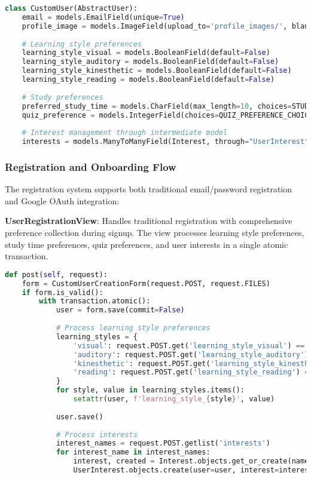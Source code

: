 \documentclass[12pt,a4paper]{article}
\begin{document}
\begin{lstlisting}[language=Python, caption=CustomUser Model Implementation]
class CustomUser(AbstractUser):
    email = models.EmailField(unique=True)
    profile_image = models.ImageField(upload_to='profile_images/', blank=True, null=True)
    
    # Learning style preferences
    learning_style_visual = models.BooleanField(default=False)
    learning_style_auditory = models.BooleanField(default=False)
    learning_style_kinesthetic = models.BooleanField(default=False)
    learning_style_reading = models.BooleanField(default=False)
    
    # Study preferences
    preferred_study_time = models.CharField(max_length=10, choices=STUDY_TIME_CHOICES, default='medium')
    quiz_preference = models.IntegerField(choices=QUIZ_PREFERENCE_CHOICES, default=3)
    
    # Interest management through intermediate model
    interests = models.ManyToManyField(Interest, through="UserInterest", related_name="users", blank=True)
\end{lstlisting}

\subsubsection{Registration and Onboarding Flow}

The registration system supports both traditional email/password registration and Google OAuth integration:

\textbf{UserRegistrationView}: Handles traditional registration with comprehensive preference collection during signup. The view processes learning style preferences, study time preferences, quiz preferences, and user interests in a single atomic transaction.

\begin{lstlisting}[language=Python, caption=Registration Flow Implementation]
def post(self, request):
    form = CustomUserCreationForm(request.POST, request.FILES)
    if form.is_valid():
        with transaction.atomic():
            user = form.save(commit=False)
            
            # Process learning style preferences
            learning_styles = {
                'visual': request.POST.get('learning_style_visual') == "1",
                'auditory': request.POST.get('learning_style_auditory') == "1",
                'kinesthetic': request.POST.get('learning_style_kinesthetic') == "1",
                'reading': request.POST.get('learning_style_reading') == "1",
            }
            for style, value in learning_styles.items():
                setattr(user, f'learning_style_{style}', value)
            
            user.save()
            
            # Process interests
            interest_names = request.POST.getlist('interests')
            for interest_name in interest_names:
                interest, created = Interest.objects.get_or_create(name=interest_name)
                UserInterest.objects.create(user=user, interest=interest)
\end{lstlisting}
\end{document}
